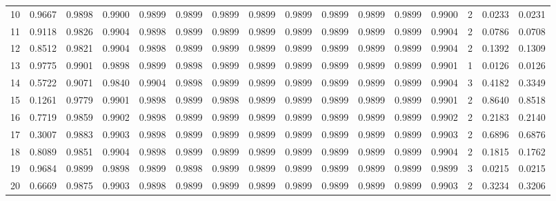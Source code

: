 \begin{tabular}{lrrrrrrrrrrrrrrr}
10  &      0.9667 &  0.9898 &  0.9900 &  0.9899 &  0.9899 &  0.9899 &  0.9899 &  0.9899 &  0.9899 &  0.9899 &   0.9899 &     0.9900 &      2 &                    0.0233 &                     0.0231 \\
11  &      0.9118 &  0.9826 &  0.9904 &  0.9898 &  0.9899 &  0.9899 &  0.9899 &  0.9899 &  0.9899 &  0.9899 &   0.9899 &     0.9904 &      2 &                    0.0786 &                     0.0708 \\
12  &      0.8512 &  0.9821 &  0.9904 &  0.9898 &  0.9899 &  0.9899 &  0.9899 &  0.9899 &  0.9899 &  0.9899 &   0.9899 &     0.9904 &      2 &                    0.1392 &                     0.1309 \\
13  &      0.9775 &  0.9901 &  0.9898 &  0.9899 &  0.9898 &  0.9899 &  0.9899 &  0.9899 &  0.9899 &  0.9899 &   0.9899 &     0.9901 &      1 &                    0.0126 &                     0.0126 \\
14  &      0.5722 &  0.9071 &  0.9840 &  0.9904 &  0.9898 &  0.9899 &  0.9899 &  0.9899 &  0.9899 &  0.9899 &   0.9899 &     0.9904 &      3 &                    0.4182 &                     0.3349 \\
15  &      0.1261 &  0.9779 &  0.9901 &  0.9898 &  0.9899 &  0.9898 &  0.9899 &  0.9899 &  0.9899 &  0.9899 &   0.9899 &     0.9901 &      2 &                    0.8640 &                     0.8518 \\
16  &      0.7719 &  0.9859 &  0.9902 &  0.9898 &  0.9899 &  0.9899 &  0.9899 &  0.9899 &  0.9899 &  0.9899 &   0.9899 &     0.9902 &      2 &                    0.2183 &                     0.2140 \\
17  &      0.3007 &  0.9883 &  0.9903 &  0.9898 &  0.9899 &  0.9899 &  0.9899 &  0.9899 &  0.9899 &  0.9899 &   0.9899 &     0.9903 &      2 &                    0.6896 &                     0.6876 \\
18  &      0.8089 &  0.9851 &  0.9904 &  0.9898 &  0.9899 &  0.9899 &  0.9899 &  0.9899 &  0.9899 &  0.9899 &   0.9899 &     0.9904 &      2 &                    0.1815 &                     0.1762 \\
19  &      0.9684 &  0.9899 &  0.9898 &  0.9899 &  0.9898 &  0.9899 &  0.9899 &  0.9899 &  0.9899 &  0.9899 &   0.9899 &     0.9899 &      3 &                    0.0215 &                     0.0215 \\
20  &      0.6669 &  0.9875 &  0.9903 &  0.9898 &  0.9899 &  0.9899 &  0.9899 &  0.9899 &  0.9899 &  0.9899 &   0.9899 &     0.9903 &      2 &                    0.3234 &                     0.3206 \\

\end{tabular}

